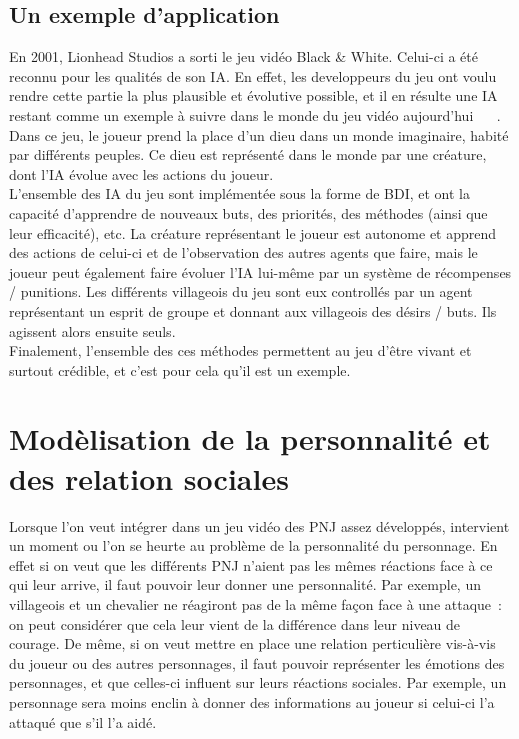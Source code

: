 \documentclass[asi]{picINSA}
\begin{document}
\section{Un exemple d'application}
En 2001, Lionhead Studios a sorti le jeu vidéo Black \& White. Celui-ci a été reconnu pour les qualités de son IA. En effet, les developpeurs du jeu ont voulu rendre cette partie la plus plausible et évolutive possible, et il en résulte une IA restant comme un exemple à suivre dans le monde du jeu vidéo aujourd'hui ~\cite{MindGames} ~\cite{CompGamesWithIntel}.\\
Dans ce jeu, le joueur prend la place d'un dieu dans un monde imaginaire, habité par différents peuples. Ce dieu est représenté dans le monde par une créature, dont l'IA évolue avec les actions du joueur.\\

L'ensemble des IA du jeu sont implémentée sous la forme de BDI, et ont la capacité d'apprendre de nouveaux buts, des priorités, des méthodes (ainsi que leur efficacité), etc. La créature représentant le joueur est autonome et apprend des actions de celui-ci et de l'observation des autres agents que faire, mais le joueur peut également faire évoluer l'IA lui-même par un système de récompenses / punitions. Les différents villageois du jeu sont eux controllés par un agent représentant un esprit de groupe et donnant aux villageois des désirs / buts. Ils agissent alors ensuite seuls.\\
Finalement, l'ensemble des ces méthodes permettent au jeu d'être vivant et surtout crédible, et c'est pour cela qu'il est un exemple.


\chapter{Modèlisation de la personnalité et des relation sociales}
Lorsque l'on veut intégrer dans un jeu vidéo des PNJ assez développés, intervient un moment ou l'on se heurte au problème de la personnalité du personnage. En effet si on veut que les différents PNJ n'aient pas les mêmes réactions face à ce qui leur arrive, il faut pouvoir leur donner une personnalité. Par exemple, un villageois et un chevalier ne réagiront pas de la même façon face à une attaque : on peut considérer que cela leur vient de la différence dans leur niveau de courage. De même, si on veut mettre en place une relation perticulière vis-à-vis du joueur ou des autres personnages, il faut pouvoir représenter les émotions des personnages, et que celles-ci influent sur leurs réactions sociales. Par exemple, un personnage sera moins enclin à donner des informations au joueur si celui-ci l'a attaqué que s’il l'a aidé. 
\end{document}
